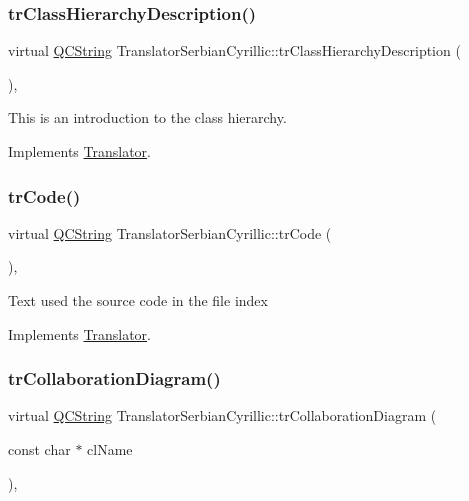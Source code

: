 \subsubsection{\texorpdfstring{trClassHierarchyDescription()}{trClassHierarchyDescription()}}
{\footnotesize\ttfamily virtual \mbox{\hyperlink{class_q_c_string}{Q\+C\+String}} Translator\+Serbian\+Cyrillic\+::tr\+Class\+Hierarchy\+Description (\begin{DoxyParamCaption}{ }\end{DoxyParamCaption})\hspace{0.3cm}{\ttfamily [inline]}, {\ttfamily [virtual]}}

This is an introduction to the class hierarchy. 

Implements \mbox{\hyperlink{class_translator}{Translator}}.

\mbox{\label{class_translator_serbian_cyrillic_a2402c7b414a1eb011e56f54b7b54f364}} 
\subsubsection{\texorpdfstring{trCode()}{trCode()}}
{\footnotesize\ttfamily virtual \mbox{\hyperlink{class_q_c_string}{Q\+C\+String}} Translator\+Serbian\+Cyrillic\+::tr\+Code (\begin{DoxyParamCaption}{ }\end{DoxyParamCaption})\hspace{0.3cm}{\ttfamily [inline]}, {\ttfamily [virtual]}}

Text used the source code in the file index 

Implements \mbox{\hyperlink{class_translator}{Translator}}.

\mbox{\label{class_translator_serbian_cyrillic_a3f0aae98d1b0afd66be7bac0c4175524}} 
\subsubsection{\texorpdfstring{trCollaborationDiagram()}{trCollaborationDiagram()}}
{\footnotesize\ttfamily virtual \mbox{\hyperlink{class_q_c_string}{Q\+C\+String}} Translator\+Serbian\+Cyrillic\+::tr\+Collaboration\+Diagram (\begin{DoxyParamCaption}\item[{const char $\ast$}]{cl\+Name }\end{DoxyParamCaption})\hspace{0.3cm}{\ttfamily [inline]}, {\ttfamily [virtual]}}

